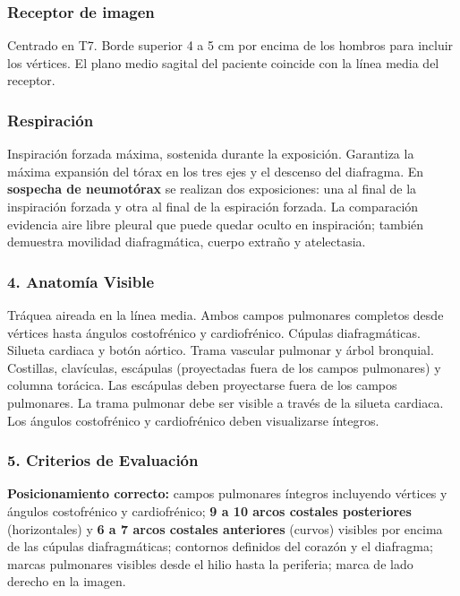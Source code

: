 \subsubsection*{Receptor de imagen}
Centrado en T7. Borde superior 4 a 5 cm por encima de los hombros para incluir los vértices. El plano medio sagital del paciente coincide con la línea media del receptor.

\subsubsection*{Respiración}
Inspiración forzada máxima, sostenida durante la exposición. Garantiza la máxima expansión del tórax en los tres ejes y el descenso del diafragma. En \textbf{sospecha de neumotórax} se realizan dos exposiciones: una al final de la inspiración forzada y otra al final de la espiración forzada. La comparación evidencia aire libre pleural que puede quedar oculto en inspiración; también demuestra movilidad diafragmática, cuerpo extraño y atelectasia.

\subsubsection*{4. Anatomía Visible}

Tráquea aireada en la línea media. Ambos campos pulmonares completos desde vértices hasta ángulos costofrénico y cardiofrénico. Cúpulas diafragmáticas. Silueta cardiaca y botón aórtico. Trama vascular pulmonar y árbol bronquial. Costillas, clavículas, escápulas (proyectadas fuera de los campos pulmonares) y columna torácica. Las escápulas deben proyectarse fuera de los campos pulmonares. La trama pulmonar debe ser visible a través de la silueta cardiaca. Los ángulos costofrénico y cardiofrénico deben visualizarse íntegros.

\subsubsection*{5. Criterios de Evaluación}

\textbf{Posicionamiento correcto:} campos pulmonares íntegros incluyendo vértices y ángulos costofrénico y cardiofrénico; \textbf{9 a 10 arcos costales posteriores} (horizontales) y \textbf{6 a 7 arcos costales anteriores} (curvos) visibles por encima de las cúpulas diafragmáticas; contornos definidos del corazón y el diafragma; marcas pulmonares visibles desde el hilio hasta la periferia; marca de lado derecho en la imagen.

